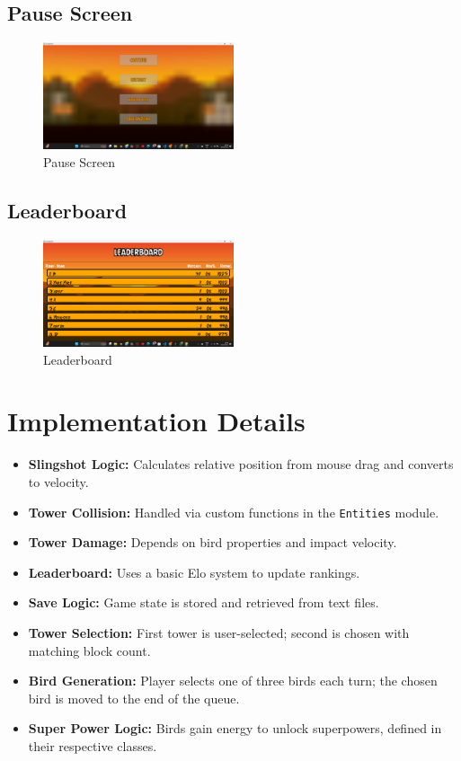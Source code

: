 \documentclass[10pt]{article}
\begin{document}
\subsection{Pause Screen}
\begin{figure}[h!]
    \centering
    \includegraphics[width=0.5\textwidth]{pause.png}
    \caption{Pause Screen}
\end{figure}

\subsection{Leaderboard}
\begin{figure}[h!]
    \centering
    \includegraphics[width=0.5\textwidth]{leaderboard.png}
    \caption{Leaderboard}
\end{figure}

\section{Implementation Details}\label{sec:implementation}
\begin{itemize}
    \item \textbf{Slingshot Logic:} Calculates relative position from mouse drag and converts to velocity.
    \item \textbf{Tower Collision:} Handled via custom functions in the \texttt{Entities} module.
    \item \textbf{Tower Damage:} Depends on bird properties and impact velocity.
    \item \textbf{Leaderboard:} Uses a basic Elo system to update rankings.
    \item \textbf{Save Logic:} Game state is stored and retrieved from text files.
    \item \textbf{Tower Selection:} First tower is user-selected; second is chosen with matching block count.
    \item \textbf{Bird Generation:} Player selects one of three birds each turn; the chosen bird is moved to the end of the queue.
    \item \textbf{Super Power Logic:} Birds gain energy to unlock superpowers, defined in their respective classes.
\end{itemize}
\end{document}
